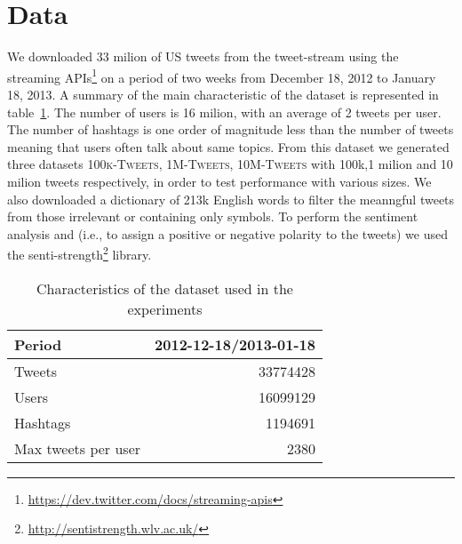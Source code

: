 \section{Data}
\label{sec:data}

We downloaded 33 milion of US tweets from the tweet-stream using the streaming APIs\footnote{\url{https://dev.twitter.com/docs/streaming-apis}} on a period of two weeks from December 18, 2012 to January 18, 2013. 
A summary of the main characteristic of the dataset is represented in table~\ref{tbl:dataset}.
The number of users is 16 milion, with an average of 2 tweets per user. 
The number of hashtags is one order of magnitude less than the number of tweets meaning that users often talk about same topics.
From this dataset we generated three datasets \textsc{100k-Tweets}, \textsc{1M-Tweets}, \textsc{10M-Tweets} with 100k,1 milion and 10 milion tweets respectively, in order to test performance with various sizes. 
We also downloaded a dictionary of 213k English words to filter the meanngful tweets from those irrelevant or containing only symbols. 
To perform the sentiment analysis and (i.e., to assign a positive or negative polarity to the tweets) we used the senti-strength\footnote{\url{http://sentistrength.wlv.ac.uk/}} library. 

\begin{table}[htb]
\centering 
\begin{tabular}{|l|r|}
\hline		
Period			& 2012-12-18/2013-01-18\\
\hline
Tweets			&	33774428\\
Users 			&	16099129\\
Hashtags 		&	1194691\\
Max tweets per user & 2380\\  
\hline
\end{tabular}
\caption{Characteristics of the dataset used in the experiments}
\label{tbl:dataset}
\end{table}

